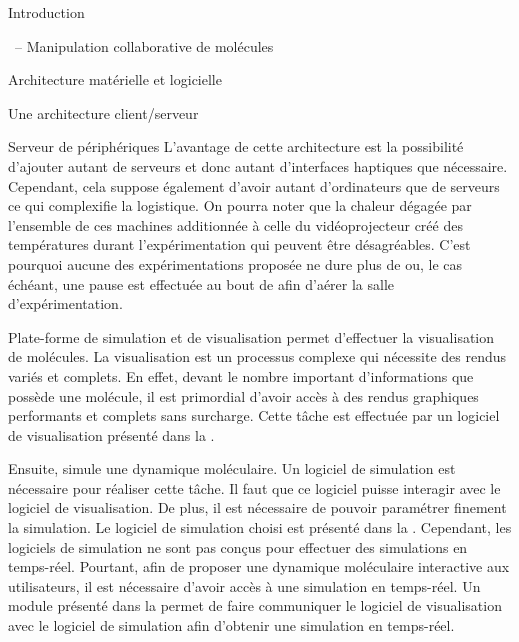 \documentclass[myfrancais]{mythesis}
\begin{document}
\begin{mypart}{Introduction}
\begin{mychapter}{\myShaddock\ -- Manipulation collaborative de molécules}
\begin{mysection}{Architecture matérielle et logicielle}
\begin{mysubsection}{Une architecture client/serveur}
\begin{mysubsubsection}{Serveur de périphériques}
						L'avantage de cette architecture est la possibilité d'ajouter autant de serveurs et donc autant d'interfaces haptiques que nécessaire.
						Cependant, cela suppose également d'avoir autant d'ordinateurs que de serveurs ce qui complexifie la logistique.
						On pourra noter que la chaleur dégagée par l'ensemble de ces machines additionnée à celle du vidéoprojecteur créé des températures durant l'expérimentation qui peuvent être désagréables.
						C'est pourquoi aucune des expérimentations proposée ne dure plus de  ou, le cas échéant, une pause est effectuée au bout de  afin d'aérer la salle d'expérimentation.
					\end{mysubsubsection}
				\end{mysubsection}
			\end{mysection}
			\begin{mysection}{Plate-forme de simulation et de visualisation}
				\myShaddock permet d'effectuer la visualisation de molécules.
				La visualisation est un processus complexe qui nécessite des rendus variés et complets.
				En effet, devant le nombre important d'informations que possède une molécule, il est primordial d'avoir accès à des rendus graphiques performants et complets sans surcharge.
				Cette tâche est effectuée par un logiciel de visualisation présenté dans la .

				Ensuite, \myShaddock simule une dynamique moléculaire.
				Un logiciel de simulation est nécessaire pour réaliser cette tâche.
				Il faut que ce logiciel puisse interagir avec le logiciel de visualisation.
				De plus, il est nécessaire de pouvoir paramétrer finement la simulation.
				Le logiciel de simulation choisi est présenté dans la .
				Cependant, les logiciels de simulation ne sont pas conçus pour effectuer des simulations en temps-réel.
				Pourtant, afin de proposer une dynamique moléculaire interactive aux utilisateurs, il est nécessaire d'avoir accès à une simulation en temps-réel.
				Un module présenté dans la  permet de faire communiquer le logiciel de visualisation avec le logiciel de simulation afin d'obtenir une simulation en temps-réel.


\end{mysection}
\end{mychapter}
\end{mypart}
\end{document}
